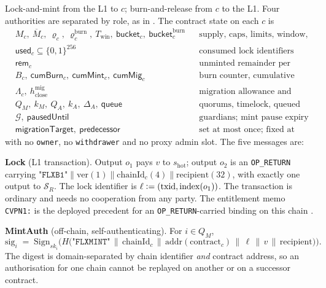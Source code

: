 \begin{construction}
\label{con:bridge}
Lock-and-mint from the L1 to $c$; burn-and-release from $c$ to the L1. Four authorities are
separated by role, as in . The contract state on each $c$ is
\begin{align*}
&M_c,\ \overline{M}_c,\ \varrho_c,\ \varrho^{\mathrm{burn}}_c,\ T_{\mathrm{win}},\ \mathsf{bucket}_c,\ \mathsf{bucket}^{\mathrm{burn}}_c
  &&\text{supply, caps, limits, window, buckets}\\
&\mathsf{used}_c \subseteq \{0,1\}^{256} &&\text{consumed lock identifiers}\\
&\mathsf{rem}_c &&\text{unminted remainder per pending lock}\\
&B_c,\ \mathsf{cumBurn}_c,\ \mathsf{cumMint}_c,\ \mathsf{cumMig}_c &&\text{burn counter, cumulative totals}\\
&\Lambda_c,\ h^{\mathrm{mig}}_{\mathrm{close}} &&\text{migration allowance and closing block}\\
&Q_M,\ k_M,\ Q_A,\ k_A,\ \Delta_A,\ \mathsf{queue} &&\text{quorums, timelock, queued changes}\\
&\mathcal{G},\ \mathsf{pausedUntil} &&\text{guardians; mint pause expiry}\\
&\mathsf{migrationTarget},\ \mathsf{predecessor} &&\text{set at most once; fixed at construction}
\end{align*}
with no \texttt{owner}, no \texttt{withdrawer} and no proxy admin slot. The five messages are:

\smallskip
\noindent\textbf{Lock} (L1 transaction). Output $o_1$ pays $v$ \sat to $s_{\mathrm{hot}}$; output
$o_2$ is an \texttt{OP\_RETURN} carrying
$\texttt{"FLXB1"} \| \mathrm{ver}(1) \| \mathrm{chainId}_c(4) \| \mathrm{recipient}(32)$, with
exactly one output to $\mathcal{S}_R$. The lock identifier is
$\ell \vcentcolon= (\mathrm{txid}, \mathrm{index}(o_1))$. The transaction is ordinary and needs no
cooperation from any party. The \CumulusVPN entitlement memo \texttt{CVPN1:} is the deployed
precedent for an \texttt{OP\_RETURN}-carried binding on this chain
.

\smallskip
\noindent\textbf{MintAuth} (off-chain, self-authenticating). For $i \in Q_M$,
\[
\mathrm{sig}_i \;=\; \mathrm{Sign}_{sk_i}\!\Big(H\big(\texttt{"FLXMINT"} \,\|\, \mathrm{chainId}_c
\,\|\, \mathrm{addr}(\mathrm{contract}_c) \,\|\, \ell \,\|\, v \,\|\, \mathrm{recipient}\big)\Big).
\]
The digest is domain-separated by chain identifier \emph{and} contract address, so an authorisation
for one chain cannot be replayed on another or on a successor contract.


\end{construction}
